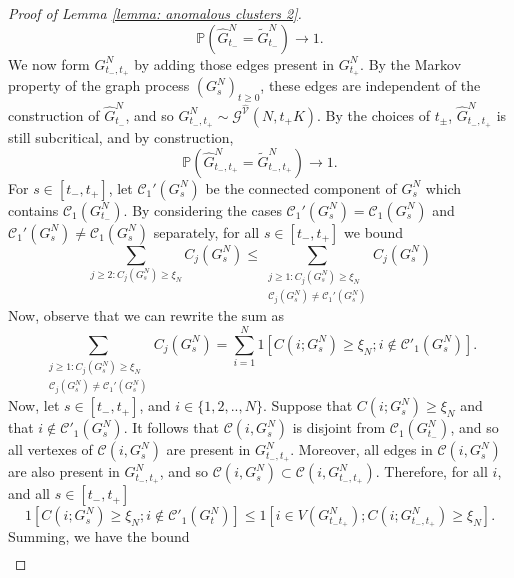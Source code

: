 \begin{proof}[Proof of Lemma \ref{lemma: anomalous clusters 2}]
\begin{equation}
    \mathbb{P}\left(\widehat{G}^N_{t_-}=\widetilde{G}^N_{t_-}\right)\rightarrow 1.
\end{equation} We now form $G^N_{t_-,t_+}$ by adding those edges present in $G^N_{t_+}$. By the Markov property of the graph process $(G^N_s)_{t\geq 0}$, these edges are independent of the construction of $\widehat{G}^N_{t_-}$, and so $G^N_{t_-,t_+}\sim \mathcal{G}^{\widehat{\mathcal{V}}}(N,t_+K)$. By the choices of $t_\pm$, $\widehat{G}^N_{t_-,t_+}$ is still subcritical, and by construction, \begin{equation}
    \mathbb{P}\left(\widehat{G}^N_{t_-, t_+}=\widetilde{G}^N_{t_-, t_+}\right)\rightarrow 1.
\end{equation} For $s\in [t_-, t_+]$, let $\mathcal{C}_1'(G^N_s)$ be the connected component of $G^N_s$ which contains $\mathcal{C}_1(G^N_{t_-})$. By considering the cases $\mathcal{C}_1'(G^N_s)=\mathcal{C}_1(G^N_s)$ and $\mathcal{C}_1'(G^N_s)\neq \mathcal{C}_1(G^N_s)$ separately, for all $s\in[t_-,t_+]$ we bound \begin{equation}
    \sum_{j\geq 2: C_j(G^N_s)\geq \xi_N} C_j(G^N_s) \leq \sum_{\substack{j\geq 1: C_j(G^N_s)\geq \xi_N \\[1ex] \mathcal{C}_j(G^N_s)\neq \mathcal{C}_1'(G^N_s)}} C_j(G^N_s)
\end{equation} Now, observe that we can rewrite the sum as \begin{equation}
    \sum_{\substack{j\geq 1: C_j(G^N_s)\geq \xi_N \\[1ex] \mathcal{C}_j(G^N_s)\neq \mathcal{C}_1'(G^N_s)}}  C_j(G^N_s) = \sum_{i=1}^N 1[C(i; G^N_s)\geq \xi_N; i \not \in \mathcal{C}'_1(G^N_s)].
\end{equation}  Now, let $s\in [t_-, t_+]$, and $i\in\{1, 2,..,N\}$. Suppose that $C(i; G^N_s)\geq \xi_N$ and that $i \not \in \mathcal{C}'_1(G^N_s)$. It follows that $\mathcal{C}(i, G^N_s)$ is disjoint from $\mathcal{C}_1(G^N_{t_-})$, and so all vertexes of $\mathcal{C}(i, G^N_s)$ are present in $G^N_{t_-,t_+}$. Moreover, all edges in $\mathcal{C}(i, G^N_s)$ are also present in $G^N_{t_-,t_+}$, and so $\mathcal{C}(i, G^N_s) \subset \mathcal{C}(i, G^N_{t_-,t_+})$. Therefore, for all $i$, and all $s\in [t_-, t_+]$ \begin{equation}
    1[C(i; G^N_s)\geq \xi_N; i \not \in \mathcal{C}'_1(G^N_t)] \leq 1[i \in V(G^N_{t_-t_+}); C(i; G^N_{t_-,t_+})\geq \xi_N].
\end{equation} Summing, we have the bound \begin{equation}\begin{split}

\end{split}
\end{equation}
\end{proof}
